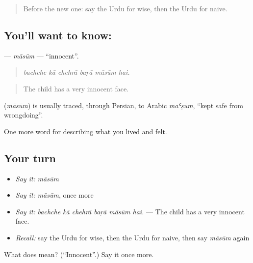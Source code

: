\label{lesson:UR-C462-masum}



\begin{quote}
Before the new one: say the Urdu for wise, then the Urdu for naive.
\end{quote}

\subsection*{You'll want to know: }
\textbf{} — \emph{māsūm} — \textquotedblleft{}innocent\textquotedblright{}.

\begin{quote}
     
\end{quote}

\begin{quote}
\emph{bachche kā chehrā baṛā māsūm hai.}
\end{quote}

\begin{quote}
The child has a very innocent face.
\end{quote}

\begin{cousinweb}
\textbf{} (\emph{māsūm}) is usually traced, through Persian, to Arabic \emph{maʿṣūm}, \textquotedblleft{}kept safe from wrongdoing\textquotedblright{}.
\end{cousinweb}

\begin{grammarlens}[title={What you've built}]
One more word for describing what you lived and felt.
\end{grammarlens}

\subsection*{Your turn}
\begin{itemize}
\raggedright
  \item \emph{Say it:} \emph{māsūm}
  \item \emph{Say it:} \emph{māsūm}, once more
  \item \emph{Say it:} \emph{bachche kā chehrā baṛā māsūm hai.} — The child has a very innocent face.
  \item \emph{Recall:} say the Urdu for wise, then the Urdu for naive, then say \emph{māsūm} again
\end{itemize}

\begin{tcolorbox}[breakable,colback=teal!4,colframe=teal!35!black,title={Before you move on}]
What does  mean? (\textquotedblleft{}Innocent\textquotedblright{}.) Say it once more.
\end{tcolorbox}
